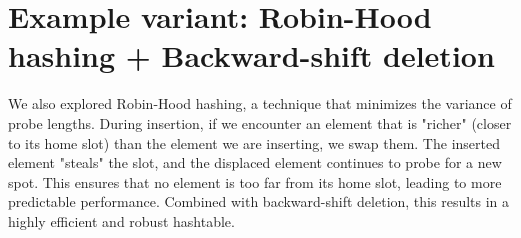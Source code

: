 \section{Example variant: Robin-Hood hashing + Backward-shift deletion}

We also explored Robin-Hood hashing, a technique that minimizes the variance of probe lengths. During insertion, if we encounter an element that is "richer" (closer to its home slot) than the element we are inserting, we swap them. The inserted element "steals" the slot, and the displaced element continues to probe for a new spot. This ensures that no element is too far from its home slot, leading to more predictable performance. Combined with backward-shift deletion, this results in a highly efficient and robust hashtable.
